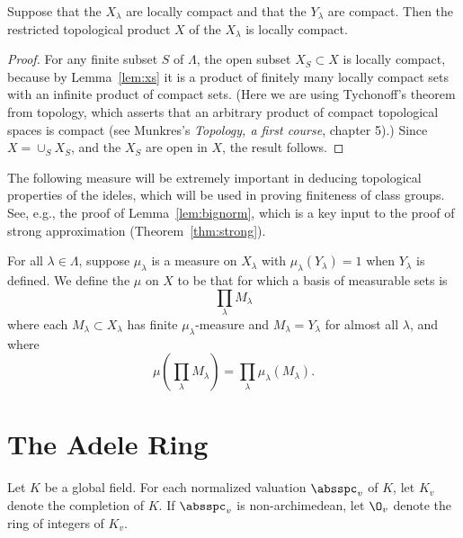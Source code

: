 \begin{lemma}\label{lem:res_compact}
  Suppose that the $X_\lambda$ are locally compact and that the
  $Y_\lambda$ are compact.  Then the restricted topological
product $X$ of the $X_\lambda$ is locally compact.
\end{lemma}
\begin{proof}
  For any finite subset $S$ of $\Lambda$, the open subset $X_S\subset
  X$ is locally compact, because by Lemma~\ref{lem:xs} it is a product
  of finitely many locally compact sets with an infinite product of
  compact sets.  (Here we are using Tychonoff's theorem from topology,
  which asserts that an arbitrary product of compact topological
  spaces is compact (see Munkres's {\em Topology, a first course},
  chapter 5).) Since $X=\cup_{S} X_S$, and the $X_S$ are open in $X$,
  the result follows.
\end{proof}

The following measure will be extremely important in deducing
topological properties of the ideles, which will be used in
proving finiteness of class groups.  See, e.g., the
proof of Lemma~\ref{lem:bignorm}, which is a key input
to the proof of strong approximation (Theorem~\ref{thm:strong}).  
\begin{definition}\label{defn:prodmeasure}
  For all $\lambda\in\Lambda$, suppose $\mu_\lambda$ is a measure on
  $X_\lambda$ with $\mu_\lambda(Y_\lambda) = 1$ when $Y_\lambda$ is
  defined.  We define the  $\mu$ on $X$ to be
  that for which a basis of measurable sets is $$\prod_\lambda
  M_\lambda$$
  where each $M_\lambda\subset X_\lambda$ has finite
  $\mu_\lambda$-measure and
  $M_\lambda=Y_\lambda$ for almost all $\lambda$, and where
  $$
  \mu\left(\prod_\lambda M_\lambda\right) = \prod_\lambda
  \mu_\lambda(M_\lambda).
  $$
\end{definition}

\section{The Adele Ring}
Let $K$ be a global field.  For each normalized valuation $\absspc_v$ of $K$,
let $K_v$ denote the completion of $K$.  If $\absspc_v$ is
non-archimedean, let $\O_v$ denote the ring of integers of $K_v$.
\renewcommand{\AA}{\mathbb{A}}

